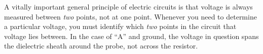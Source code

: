 A vitally important general principle of electric circuits is that voltage is always measured between {\it two} points, not at one point.  Whenever you need to determine a particular voltage, you must identify which {\it two} points in the circuit that voltage lies between.  In the case of ``A'' and ground, the voltage in question spans the dielectric sheath around the probe, not across the resistor.




